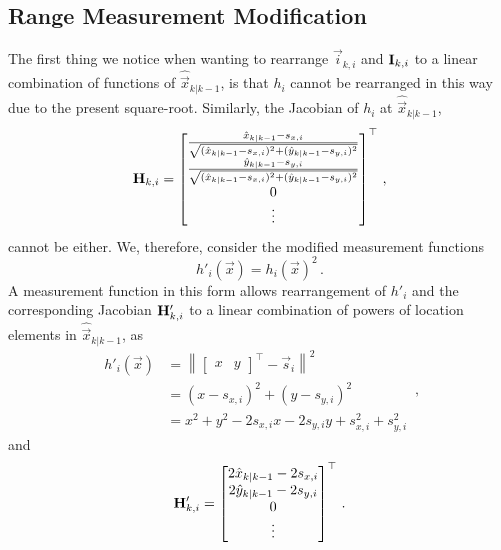 \subsection{Range Measurement Modification}\label{subsec:nonlin_fusion:measurement_modification}
The first thing we notice when wanting to rearrange $\vec{i}_{k,i}$ and ${{\mathbf{I}}}_{k,i}$ to a linear combination of functions of $\hat{\vec{x}}_{k|k-1}$, is that $h_i$ cannot be rearranged in this way due to the present square-root. Similarly, the Jacobian of $h_i$ at $\hat{\vec{x}}_{k|k-1}$,
\begin{equation}
    {\ensuremath{{\mathbf{H}}}}_{k,i} = 
    \begin{bmatrix}
        \frac{\hat{x}_{k|k-1} - s_{x,i}}{\sqrt{(\hat{x}_{k|k-1} - s_{x,i})^2 + (\hat{y}_{k|k-1} - s_{y,i})^2}} \\
        \frac{\hat{y}_{k|k-1} - s_{y,i}}{\sqrt{(\hat{x}_{k|k-1} - s_{x,i})^2 + (\hat{y}_{k|k-1} - s_{y,i})^2}} \\
        0 \\
        \vdots
    \end{bmatrix}^\top\,,
\end{equation}
cannot be either. We, therefore, consider the modified measurement functions
\begin{equation}
    h'_i(\vec{x}) = h_i(\vec{x})^2\,. \label{eqn:modified_measurement_func}
\end{equation}
A measurement function in this form allows rearrangement of $h'_i$ and the corresponding Jacobian ${{\mathbf{H}}}'_{k,i}$ to a linear combination of powers of location elements in $\hat{\vec{x}}_{k|k-1}$, as
\begin{equation}
    \begin{split}
        h'_i(\vec{x}) &= \left\lVert
        \begin{bmatrix}
            x & y
        \end{bmatrix}^\top - \vec{s}_i\right\rVert^2 \\
        &= (x - s_{x,i})^2 + (y - s_{y,i})^2 \\
        &= x^2 + y^2 -2s_{x,i}x -2s_{y,i}y +s_{x,i}^2 +s_{y,i}^2
    \end{split}\,,
\end{equation}
and
\begin{equation}
    {\ensuremath{{\mathbf{H}}}}'_{k,i} = 
    \begin{bmatrix}
        2\hat{x}_{k|k-1} - 2s_{x,i} \\
        2\hat{y}_{k|k-1} - 2s_{y,i} \\
        0 \\
        \vdots
    \end{bmatrix}^\top\,. \label{eqn:modified_jacobian}
\end{equation}
